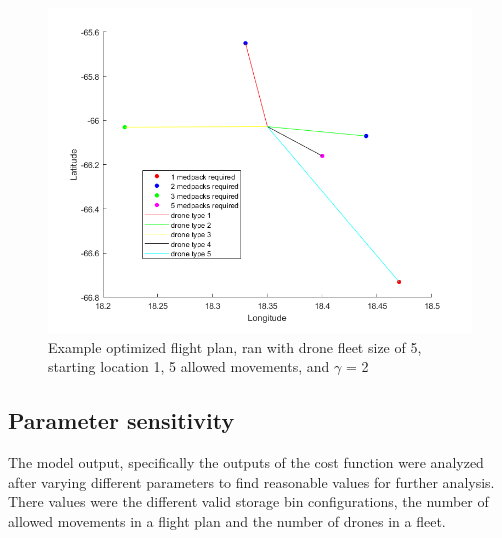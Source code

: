 \documentclass[twocolumn,10pt]{asme2ej}
\begin{document}
\begin{figure}
	\centering
	\includegraphics[width=0.7\linewidth]{../example_flight_plan}
	\caption[Fig 1.]{Example optimized flight plan, ran with drone fleet size of 5, starting location 1, 5 allowed movements, and $\gamma$ = 2}
	\label{Fig 1.}
\end{figure}

\subsection{Parameter sensitivity}
The model output, specifically the outputs of the cost function were analyzed after varying different parameters to find reasonable values for further analysis. There values were the different valid storage bin configurations, the number of allowed movements in a flight plan and the number of drones in a fleet.
\end{document}
